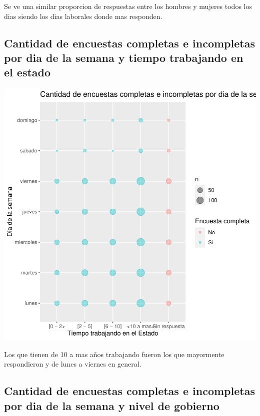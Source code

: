 \documentclass{article}
\begin{document}
Se ve una similar proporcion de respuestas entre los hombres y mujeres todos los dias siendo los dias laborales donde mas responden.

\subsection{Cantidad de encuestas completas e incompletas por dia de la semana y tiempo trabajando en el estado}

\includegraphics{seguimientov3-054}

Los que tienen de 10 a mas años trabajando fueron los que mayormente respondieron y de lunes a viernes en general.

\subsection{Cantidad de encuestas completas e incompletas por dia de la semana y nivel de gobierno}
\end{document}
